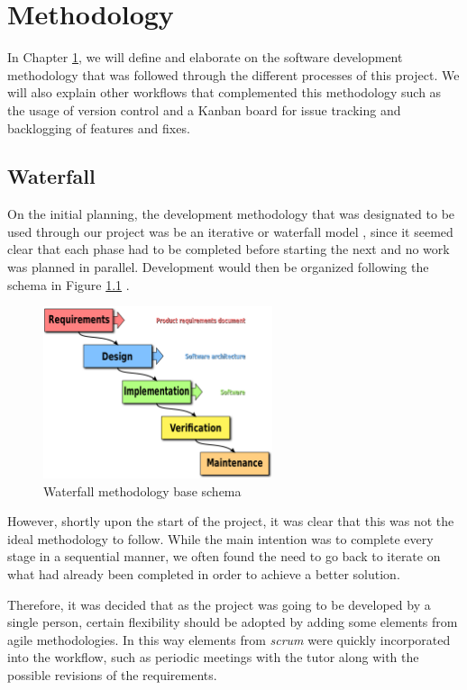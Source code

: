 \chapter{Methodology}
\label{chapter4}

In Chapter \ref{chapter4}, we will define and elaborate on the software development methodology that was followed through the different processes of this project. We will also explain other workflows that complemented this methodology such as the usage of version control and a Kanban board for issue tracking and backlogging of features and fixes.

\section{Waterfall}

On the initial planning, the development methodology that was designated to be used through our project was be an iterative or waterfall model \cite{balaji_waterfall_2012}, since it seemed clear that each phase had to be completed before starting the next and no work was planned in parallel. Development would then be organized following the schema in Figure \ref{fig:waterfall} \cite{noauthor__2021}.

\begin{figure}[h]
  \centering
  \includegraphics[width=0.6\textwidth]{Figures/waterfall.png}
  \caption{%
    Waterfall methodology base schema
  }
  \label{fig:waterfall}
\end{figure}

However, shortly upon the start of the project, it was clear that this was not the ideal methodology to follow. While the main intention was to complete every stage in a sequential manner, we often found the need to go back to iterate on what had already been completed in order to achieve a better solution.

Therefore, it was decided that as the project was going to be developed by a single person, certain flexibility should be adopted by adding some elements from agile methodologies. In this way elements from \textit{scrum} were quickly incorporated into the workflow, such as periodic meetings with the tutor along with the possible revisions of the requirements.

